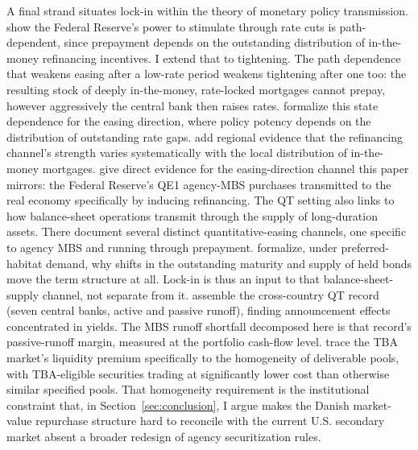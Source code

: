 \documentclass[12pt]{article}
\begin{document}
A final strand situates lock-in within the theory of monetary policy transmission. \citet{berger2021} show the Federal Reserve's power to stimulate through rate cuts is path-dependent, since prepayment depends on the outstanding distribution of in-the-money refinancing incentives. I extend that to tightening. The path dependence that weakens easing after a low-rate period weakens tightening after one too: the resulting stock of deeply in-the-money, rate-locked mortgages cannot prepay, however aggressively the central bank then raises rates. \citet{eichenbaum2022} formalize this state dependence for the easing direction, where policy potency depends on the distribution of outstanding rate gaps. \citet{beraja2019} add regional evidence that the refinancing channel's strength varies systematically with the local distribution of in-the-money mortgages. \citet{dimaggio2020} give direct evidence for the easing-direction channel this paper mirrors: the Federal Reserve's QE1 agency-MBS purchases transmitted to the real economy specifically by inducing refinancing. The QT setting also links to how balance-sheet operations transmit through the supply of long-duration assets. There \citet{krishnamurthy2011} document several distinct quantitative-easing channels, one specific to agency MBS and running through prepayment. \citet{vayanos2021} formalize, under preferred-habitat demand, why shifts in the outstanding maturity and supply of held bonds move the term structure at all. Lock-in is thus an input to that balance-sheet-supply channel, not separate from it. \citet{du2024} assemble the cross-country QT record (seven central banks, active and passive runoff), finding announcement effects concentrated in yields. The MBS runoff shortfall decomposed here is that record's passive-runoff margin, measured at the portfolio cash-flow level. \citet{vickery2013} trace the TBA market's liquidity premium specifically to the homogeneity of deliverable pools, with TBA-eligible securities trading at significantly lower cost than otherwise similar specified pools. That homogeneity requirement is the institutional constraint that, in Section~\ref{sec:conclusion}, I argue makes the Danish market-value repurchase structure hard to reconcile with the current U.S. secondary market absent a broader redesign of agency securitization rules.
\end{document}
